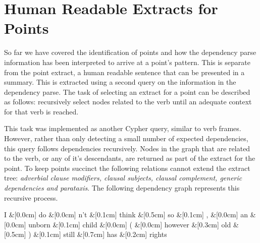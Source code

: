   \section{Human Readable Extracts for Points}
    So far we have covered the identification of points and how the dependency parse information has been interpreted to arrive at a point's pattern. This is separate from the point extract, a human readable sentence that can be presented in a summary. This is extracted using a second query on the information in the dependency parse. The task of selecting an extract for a point can be described as follows: recursively select nodes related to the verb until an adequate context for that verb is reached.

    This task was implemented as another Cypher query, similar to verb frames. However, rather than only detecting a small number of expected dependencies, this query follows dependencies recursively. Nodes in the graph that are related to the verb, or any of it's descendants, are returned as part of the extract for the point. To keep points succinct the following relations cannot extend the extract tree: \textit{adverbial clause modifiers, clausal subjects, clausal complement, generic dependencies and parataxis}. The following dependency graph represents this recursive process.

    \begin{center}
      \begin{dependency}[edge horizontal padding=0]
        \begin{deptext}
          I \&[0.0cm] do \&[0.0cm] n't \&[0.1cm] think \&[0.5cm] so \&[0.1cm] , \&[0.0cm] an \&[0.0cm] unborn \&[0.1cm] child \&[0.0cm] ( \&[0.0cm] however \&[0.3cm] old \&[0.5cm] ) \&[0.1cm] still \&[0.7cm] has \&[0.2cm] rights \\
        \end{deptext}





      \end{dependency}
    \end{center}


